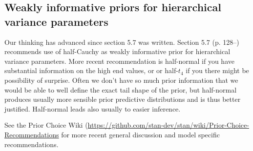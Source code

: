 \documentclass[a4paper,11pt,english]{article}
\begin{document}
\subsection*{Weakly informative priors for hierarchical variance parameters}

  Our thinking has advanced since section 5.7 was written. 
  Section 5.7 (p. 128--) recommends use of half-Cauchy as weakly
  informative prior for hierarchical variance parameters. More recent
  recommendation is half-normal if you have substantial information on
  the high end values, or or half-$t_4$ if you there
  might be possibility of surprise. Often we don't have so much prior
  information that we would be able to well define the exact tail
  shape of the prior, but half-normal produces usually more sensible
  prior predictive distributions and is thus better
  justified. Half-normal leads also usually to easier inference.

See the Prior
Choice Wiki
(\url{https://github.com/stan-dev/stan/wiki/Prior-Choice-Recommendations}
for more recent general discussion and model specific recommendations.
\end{document}
